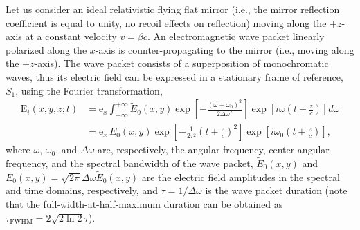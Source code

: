 \documentclass[10pt, a4paper, twoside, openright]{report}
\renewcommand{\vec}[1]{\boldsymbol{\mathrm{#1}}}
\begin{document}
Let us consider an ideal relativistic flying flat mirror (i.e., the mirror reflection coefficient is equal to unity, no recoil effects on reflection) moving along the $ +z $-axis at a constant velocity $ v = \beta c $. An electromagnetic wave packet linearly polarized along the $ x $-axis is counter-propagating to the mirror (i.e., moving along the $ -z $-axis). The wave packet consists of a superposition of monochromatic waves, thus its electric field can be expressed in a stationary frame of reference, $ S_1 $, using the Fourier transformation,
\begin{equation}\label{eq:incident_lab_frame_1}
\begin{split}
\vec{E}_i \left(x, y, z; t \right) &= \vec{e}_x \int_{-\infty}^{+\infty} \tilde{E}_0 \left(x, y \right) \exp \left[ -\frac{\left( \omega - \omega_0 \right)^2}{2 \Delta \omega^2} \right] \exp \left[ i \omega \left(t + \frac{z}{c}\right) \right] d \omega \\
&= \vec{e}_x \, E_0 \left(x, y \right) \exp \left[ - \frac{1}{2 \tau^2} \left(t + \frac{z}{c}\right)^2 \right] \exp \left[ i \omega_0 \left(t + \frac{z}{c}\right) \right],
\end{split}
\end{equation}
where $ \omega $, $ \omega_0 $, and $ \Delta \omega $ are, respectively, the angular frequency, center angular frequency, and the spectral bandwidth of the wave packet, $ \tilde{E}_0 \left(x, y \right) $ and $ E_0 \left(x, y \right) = \sqrt{2 \pi} \Delta \omega \tilde{E}_0 \left(x, y \right) $ are the electric field amplitudes in the spectral and time domains, respectively, and $ \tau = 1 / \Delta \omega $ is the wave packet duration (note that the full-width-at-half-maximum duration can be obtained as $ \tau_{\mathrm{FWHM}} = 2 \sqrt{2 \ln 2} \tau $).

\end{document}
